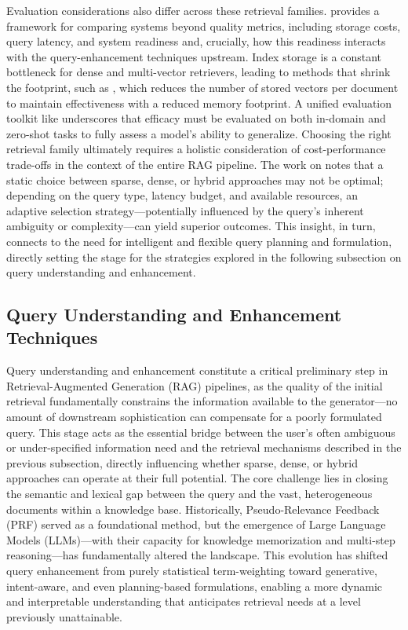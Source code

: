\documentclass[11pt]{article}
\begin{document}
Evaluation considerations also differ across these retrieval families. \cite{ref93} provides a framework for comparing systems beyond quality metrics, including storage costs, query latency, and system readiness and, crucially, how this readiness interacts with the query-enhancement techniques upstream. Index storage is a constant bottleneck for dense and multi-vector retrievers, leading to methods that shrink the footprint, such as \cite{ref94}, which reduces the number of stored vectors per document to maintain effectiveness with a reduced memory footprint. A unified evaluation toolkit like \cite{ref95} underscores that efficacy must be evaluated on both in-domain and zero-shot tasks to fully assess a model's ability to generalize. Choosing the right retrieval family ultimately requires a holistic consideration of cost-performance trade-offs in the context of the entire RAG pipeline. The work on \cite{ref96} notes that a static choice between sparse, dense, or hybrid approaches may not be optimal; depending on the query type, latency budget, and available resources, an adaptive selection strategy---potentially influenced by the query's inherent ambiguity or complexity---can yield superior outcomes. This insight, in turn, connects to the need for intelligent and flexible query planning and formulation, directly setting the stage for the strategies explored in the following subsection on query understanding and enhancement.

\subsection{Query Understanding and Enhancement Techniques}

Query understanding and enhancement constitute a critical preliminary step in Retrieval-Augmented Generation (RAG) pipelines, as the quality of the initial retrieval fundamentally constrains the information available to the generator---no amount of downstream sophistication can compensate for a poorly formulated query. This stage acts as the essential bridge between the user's often ambiguous or under-specified information need and the retrieval mechanisms described in the previous subsection, directly influencing whether sparse, dense, or hybrid approaches can operate at their full potential. The core challenge lies in closing the semantic and lexical gap between the query and the vast, heterogeneous documents within a knowledge base. Historically, Pseudo-Relevance Feedback (PRF) served as a foundational method, but the emergence of Large Language Models (LLMs)---with their capacity for knowledge memorization and multi-step reasoning---has fundamentally altered the landscape. This evolution has shifted query enhancement from purely statistical term-weighting toward generative, intent-aware, and even planning-based formulations, enabling a more dynamic and interpretable understanding that anticipates retrieval needs at a level previously unattainable.
\end{document}
